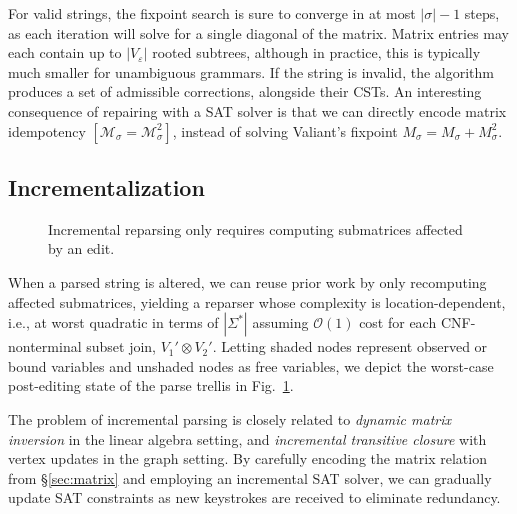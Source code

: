 \documentclass[sigplan,review,anonymous,acmsmall]{acmart}\settopmatter{printfolios=false,printccs=false,printacmref=false}
\begin{document}
For valid strings, the fixpoint search is sure to converge in at most $|\sigma| - 1$ steps, as each iteration will solve for a single diagonal of the matrix. Matrix entries may each contain up to $|V_\varepsilon|$ rooted subtrees, although in practice, this is typically much smaller for unambiguous grammars. If the string is invalid, the algorithm produces a set of admissible corrections, alongside their CSTs. An interesting consequence of repairing with a SAT solver is that we can directly encode matrix idempotency $[\mathcal{M}_\sigma=\mathcal{M}_\sigma^2]$, instead of solving Valiant's fixpoint $M_\sigma = M_\sigma + M^2_\sigma$.

\subsection{Incrementalization}\label{sec:incrementalization}

\begin{figure}
  \vspace{-13pt}
  \resizebox{.4\textwidth}{!}{}
  \caption{Incremental reparsing only requires computing submatrices affected by an edit.}
  \label{fig:incremental}
\end{figure}

When a parsed string is altered, we can reuse prior work by only recomputing affected submatrices, yielding a reparser whose complexity is location-dependent, i.e., at worst quadratic in terms of $|\Sigma^*|$ assuming $\mathcal{O}(1)$ cost for each CNF-nonterminal subset join, $V_1'\otimes V_2'$. Letting shaded nodes represent observed or bound variables and unshaded nodes as free variables, we depict the worst-case post-editing state of the parse trellis in Fig.~\ref{fig:incremental}.

The problem of incremental parsing is closely related to \textit{dynamic matrix inversion} in the linear algebra setting, and \textit{incremental transitive closure} with vertex updates in the graph setting. By carefully encoding the matrix relation from \S\ref{sec:matrix} and employing an incremental SAT solver, we can gradually update SAT constraints as new keystrokes are received to eliminate redundancy.

\end{document}
